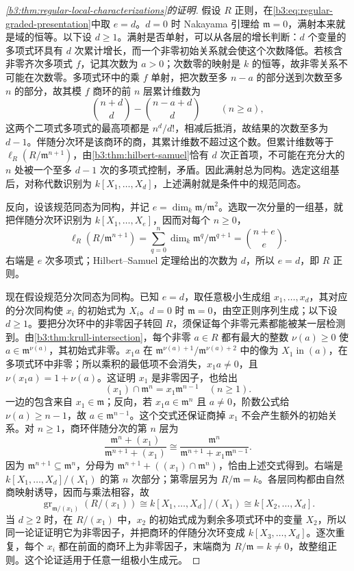 \begin{proof}[\cref{b3:thm:regular-local-characterizations}的证明]
	假设 \(R\) 正则，在\eqref{b3:eq:regular-graded-presentation}中取 \(e=d\)。\(d=0\) 时 Nakayama 引理给 \(\mathfrak m=0\)，满射本来就是域的恒等。以下设 \(d\ge1\)。满射是否单射，可以从各层的增长判断：\(d\) 个变量的多项式环具有 \(d\) 次累计增长，而一个非零初始关系就会使这个次数降低。若核含非零齐次多项式 \(f\)，记其次数为 \(a>0\)；次数零的映射是 \(k\) 的恒等，故非零关系不可能在次数零。多项式环中的乘 \(f\) 单射，把次数至多 \(n-a\) 的部分送到次数至多 \(n\) 的部分，故其模 \(f\) 商环的前 \(n\) 层累计维数为
	\[
		\binom{n+d}{d}-\binom{n-a+d}{d}\qquad(n\ge a),
	\]
	这两个二项式多项式的最高项都是 \(n^d/d!\)，相减后抵消，故结果的次数至多为 \(d-1\)。伴随分次环是该商环的商，其累计维数不超过这个数。但累计维数等于 \(\ell_R(R/\mathfrak m^{n+1})\)，由\cref{b3:thm:hilbert-samuel}恰有 \(d\) 次正首项，不可能在充分大的 \(n\) 处被一个至多 \(d-1\) 次的多项式控制，矛盾。因此满射总为同构。选定这组基后，对称代数识别为 \(k[X_1,\ldots,X_d]\)，上述满射就是条件中的规范同态。

	反向，设该规范同态为同构，并记 \(e=\dim_k\mathfrak m/\mathfrak m^2\)。选取一次分量的一组基，就把伴随分次环识别为 \(k[X_1,\ldots,X_e]\)，因而对每个 \(n\ge0\)，
	\[
		\ell_R(R/\mathfrak m^{n+1}) =\sum_{q=0}^n\dim_k\mathfrak m^q/\mathfrak m^{q+1} =\binom{n+e}{e}.
	\]
	右端是 \(e\) 次多项式；Hilbert–Samuel 定理给出的次数为 \(d\)，所以 \(e=d\)，即 \(R\) 正则。

	现在假设规范分次同态为同构。已知 \(e=d\)，取任意极小生成组 \(x_1,\ldots,x_d\)，其对应的分次同构使 \(x_i\) 的初始式为 \(X_i\)。\(d=0\) 时 \(\mathfrak m=0\)，由空正则序列生成；以下设 \(d\ge1\)。要把分次环中的非零因子转回 \(R\)，须保证每个非零元素都能被某一层检测到。由\cref{b3:thm:krull-intersection}，每个非零 \(a\in R\) 都有最大的整数 \(\nu(a)\ge0\) 使 \(a\in\mathfrak m^{\nu(a)}\)，其初始式非零。\(x_1a\) 在 \(\mathfrak m^{\nu(a)+1}/\mathfrak m^{\nu(a)+2}\) 中的像为 \(X_1\operatorname{in}(a)\)，在多项式环中非零；所以乘积的最低项不会消失，\(x_1a\ne0\)，且 \(\nu(x_1a)=1+\nu(a)\)。这证明 \(x_1\) 是非零因子，也给出
	\[
		(x_1)\cap\mathfrak m^n=x_1\mathfrak m^{n-1}\quad(n\ge1).
	\]
	一边的包含来自 \(x_1\in\mathfrak m\)；反向，若 \(x_1a\in\mathfrak m^n\) 且 \(a\ne0\)，阶数公式给 \(\nu(a)\ge n-1\)，故 \(a\in\mathfrak m^{n-1}\)。这个交式还保证商掉 \(x_1\) 不会产生额外的初始关系。对 \(n\ge1\)，商环伴随分次的第 \(n\) 层为
	\[
		\dfrac{\mathfrak m^n+(x_1)}{\mathfrak m^{n+1}+(x_1)} \cong \dfrac{\mathfrak m^n}{\mathfrak m^{n+1}+x_1\mathfrak m^{n-1}}.
	\]
	因为 \(\mathfrak m^{n+1}\subseteq\mathfrak m^n\)，分母为 \(\mathfrak m^{n+1}+((x_1)\cap\mathfrak m^n)\)，恰由上述交式得到。右端是 \(k[X_1,\ldots,X_d]/(X_1)\) 的第 \(n\) 次部分；第零层另为 \(R/\mathfrak m=k\)。各层同构都由自然商映射诱导，因而与乘法相容，故
	\[
		\operatorname{gr}_{\mathfrak m/(x_1)}(R/(x_1)) \cong k[X_1,\ldots,X_d]/(X_1) \cong k[X_2,\ldots,X_d].
	\]
	当 \(d\ge2\) 时，在 \(R/(x_1)\) 中，\(x_2\) 的初始式成为剩余多项式环中的变量 \(X_2\)，所以同一论证证明它为非零因子，并把商环的伴随分次环变成 \(k[X_3,\ldots,X_d]\)。逐次重复，每个 \(x_i\) 都在前面的商环上为非零因子，末端商为 \(R/\mathfrak m=k\ne0\)，故整组正则。这个论证适用于任意一组极小生成元。


\end{proof}
